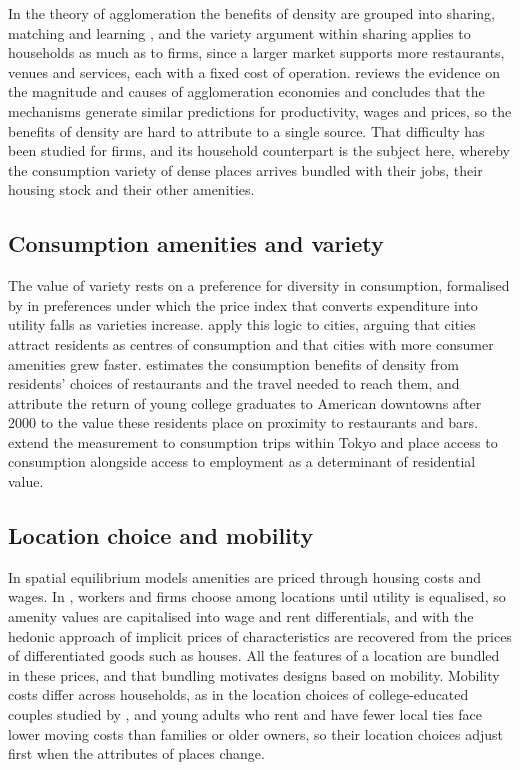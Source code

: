 \documentclass[11pt,a4paper]{article}
\begin{document}
In the theory of agglomeration the benefits of density are grouped into sharing, matching and learning \citep{duranton2004}, and the variety argument within sharing applies to households as much as to firms, since a larger market supports more restaurants, venues and services, each with a fixed cost of operation. \citet{puga2010} reviews the evidence on the magnitude and causes of agglomeration economies and concludes that the mechanisms generate similar predictions for productivity, wages and prices, so the benefits of density are hard to attribute to a single source. That difficulty has been studied for firms, and its household counterpart is the subject here, whereby the consumption variety of dense places arrives bundled with their jobs, their housing stock and their other amenities.

\subsection{Consumption amenities and variety}

The value of variety rests on a preference for diversity in consumption, formalised by \citet{dixit1977} in preferences under which the price index that converts expenditure into utility falls as varieties increase. \citet{glaeser2001} apply this logic to cities, arguing that cities attract residents as centres of consumption and that cities with more consumer amenities grew faster. \citet{couture2016} estimates the consumption benefits of density from residents' choices of restaurants and the travel needed to reach them, and \citet{couture2020} attribute the return of young college graduates to American downtowns after 2000 to the value these residents place on proximity to restaurants and bars. \citet{miyauchi2025} extend the measurement to consumption trips within Tokyo and place access to consumption alongside access to employment as a determinant of residential value.

\subsection{Location choice and mobility}

In spatial equilibrium models amenities are priced through housing costs and wages. In \citet{roback1982}, workers and firms choose among locations until utility is equalised, so amenity values are capitalised into wage and rent differentials, and with the hedonic approach of \citet{rosen1974} implicit prices of characteristics are recovered from the prices of differentiated goods such as houses. All the features of a location are bundled in these prices, and that bundling motivates designs based on mobility. Mobility costs differ across households, as in the location choices of college-educated couples studied by \citet{costa2000}, and young adults who rent and have fewer local ties face lower moving costs than families or older owners, so their location choices adjust first when the attributes of places change.
\end{document}
